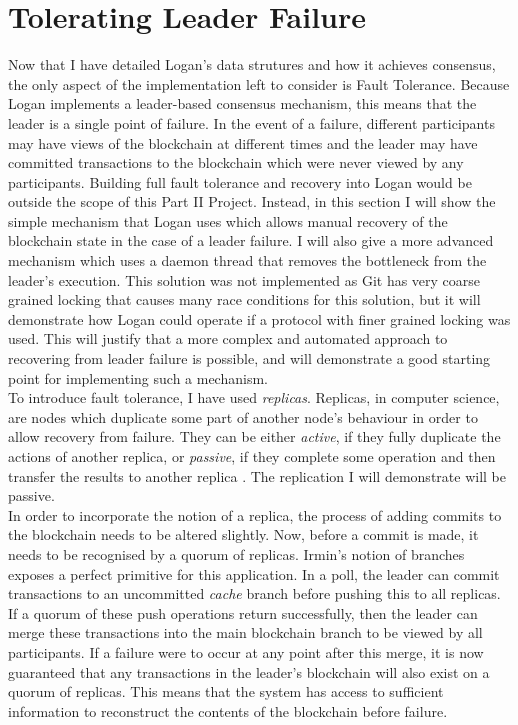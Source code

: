 \documentclass[12pt,a4paper,twoside,openright]{report}
\begin{document}
	\section{Tolerating Leader Failure}\label{sec:faulttol}
	Now that I have detailed Logan's data strutures and how it achieves consensus, the only aspect of the implementation left to consider is Fault Tolerance.
	Because Logan implements a leader-based consensus mechanism, this means that the leader is a single point of failure.
	In the event of a failure, different participants may have views of the blockchain at different times and the leader may have committed transactions to the blockchain which were never viewed by any participants. 
	Building full fault tolerance and recovery into Logan would be outside the scope of this Part II Project. 
	Instead, in this section I will show the simple mechanism that Logan uses which allows manual recovery of the blockchain state in the case of a leader failure. 
	I will also give a more advanced mechanism which uses a daemon thread that removes the bottleneck from the leader's execution. 
	This solution was not implemented as Git has very coarse grained locking that causes many race conditions for this solution, but it will demonstrate how Logan could operate if a protocol with finer grained locking was used. 
	This will justify that a more complex and automated approach to recovering from leader failure is possible, and will demonstrate a good starting point for implementing such a mechanism. \\

	To introduce fault tolerance, I have used \textit{replicas}. 
	Replicas, in computer science, are nodes which duplicate some part of another node's behaviour in order to allow recovery from failure. 
	They can be either \textit{active}, if they fully duplicate the actions of another replica, or \textit{passive}, if they complete some operation and then transfer the results to another replica \cite{Replication}.
	The replication I will demonstrate will be passive.\\

	In order to incorporate the notion of a replica, the process of adding commits to the blockchain needs to be altered slightly.
	Now, before a commit is made, it needs to be recognised by a quorum of replicas.
	Irmin's notion of branches exposes a perfect primitive for this application.
	In a poll, the leader can commit transactions to an uncommitted \textit{cache} branch before pushing this to all replicas.
	If a quorum of these push operations return successfully, then the leader can merge these transactions into the main blockchain branch to be viewed by all participants.
	If a failure were to occur at any point after this merge, it is now guaranteed that any transactions in the leader's blockchain will also exist on a quorum of replicas.
	This means that the system has access to sufficient information to reconstruct the contents of the blockchain before failure.\\
\end{document}
